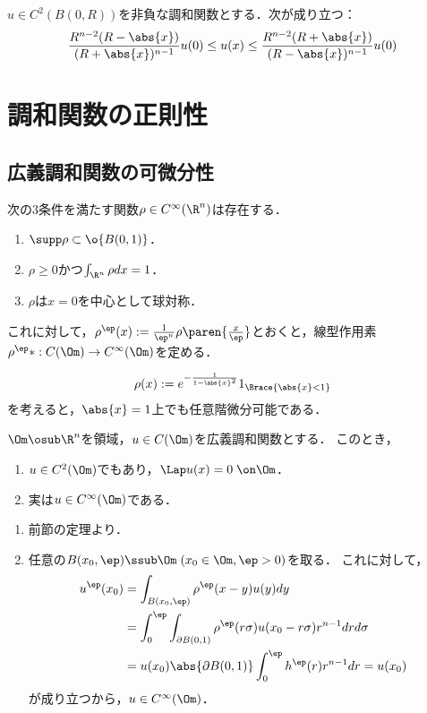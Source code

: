 \documentclass[uplatex,dvipdfmx]{jsreport}
\begin{document}
\begin{corollary}[Poisson核が与えるHarnackの不等式]
    $u\in C^2(B(0,R))$を非負な調和関数とする．次が成り立つ：
    \[\frac{R^{n-2}(R-\abs{x})}{(R+\abs{x})^{n-1}}u(0)\le u(x)\le \frac{R^{n-2}(R+\abs{x})}{(R-\abs{x})^{n-1}}u(0)\]
\end{corollary}

\section{調和関数の正則性}

\subsection{広義調和関数の可微分性}

\begin{lemma}[軟化子の性質]
    次の3条件を満たす関数$\rho\in C^\infty(\R^n)$は存在する．
    \begin{enumerate}
        \item $\supp\rho\subset\o{B(0,1)}$．
        \item $\rho\ge0$かつ$\int_{\R^n}\rho dx=1$．
        \item $\rho$は$x=0$を中心として球対称．
    \end{enumerate}
    これに対して，$\rho^\ep(x):=\frac{1}{\ep^n}\rho\paren{\frac{x}{\ep}}$とおくと，線型作用素$\rho^\ep*:C(\Om)\to C^\infty(\Om)$を定める．
\end{lemma}
\begin{Proof}
    \[\rho(x):=e^{-\frac{1}{1-\abs{x}^2}}1_{\Brace{\abs{x}<1}}\]
    を考えると，$\abs{x}=1$上でも任意階微分可能である．
\end{Proof}

\begin{theorem}[Laplace方程式の解の正則性]
    $\Om\osub\R^n$を領域，$u\in C(\Om)$を広義調和関数とする．
    このとき，
    \begin{enumerate}
        \item $u\in C^2(\Om)$でもあり，$\Lap u(x)=0\;\on\Om$．
        \item 実は$u\in C^\infty(\Om)$である．
    \end{enumerate}
\end{theorem}
\begin{Proof}\mbox{}
    \begin{enumerate}
        \item 前節の定理より．
        \item 任意の$B(x_0,\ep)\ssub\Om\;(x_0\in\Om,\ep>0)$を取る．
        これに対して，
        \begin{align*}
            u^\ep(x_0)&=\int_{B(x_0,\ep)}\rho^\ep(x-y)u(y)dy\\
            &=\int^\ep_0\int_{\partial B(0,1)}\rho^\ep(r\sigma)u(x_0-r\sigma)r^{n-1}drd\sigma\\
            &=u(x_0)\abs{\partial B(0,1)}\int^\ep_0h^\ep(r)r^{n-1}dr=u(x_0)
        \end{align*}
        が成り立つから，$u\in C^\infty(\Om)$．
    \end{enumerate}
\end{Proof}
\end{document}
